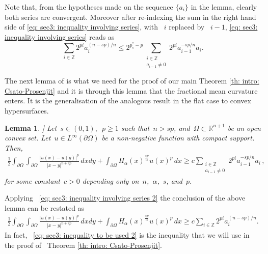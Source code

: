 \documentclass[reqno,12pt]{amsart}
\newcommand{\R}{\mathbb{R}}
\newcommand{\Z}{\mathbb{Z}}
\newcommand{\delomega}{\partial\Omega}
\numberwithin{equation}{section}
\theoremstyle{plain}
\newtheorem{lemma}[definition]{Lemma}
\theoremstyle{definition}
\renewcommand{\leq}{\leqslant}
\renewcommand{\ge}{\geqslant}
\begin{document}
Note that, from the hypotheses made on the sequence $\{a_{i}\}$ in the lemma, clearly both series are convergent. Moreover after re-indexing the sum in the 
right hand side of \eqref{eq: sec3: inequality involving series},
with ~$i$ replaced by ~$i-1$, \eqref{eq: sec3: inequality involving series} reads as 
\begin{equation}\label{eq: sec3: inequality involving series 2}
     \sum_{i\in \mathbb{Z}} 2^{pi} a_i^{(n-s p)/n} \leq 2^{p^{\ast}_s-p}\sum_{\substack {i\in\mathbb{Z} \\ a_{i-1}\neq 0}}2^{pi}a_{i-1}^{-s p/n}a_{i}.
\end{equation}


The next lemma of \cite{Cabre-Cozzi-Csato} is what we need for  the proof of our main  Theorem \ref{th: intro: Csato-Prosenjit} and it is through this lemma that the fractional mean curvature enters. It is the generalisation of the analogous result \cite[Lemma 6.3]{HitchhikersG} in the flat case to convex hypersurfaces.

\begin{lemma}\cite[Lemma 4.3]{Cabre-Cozzi-Csato}]
\label{Analogue Lemma 6.3 in HG} Let~$s\in (0,1),$~$p \ge 1$ such that~$n > s p$, and~$\Omega\subset\R^{n+1}$ be an open convex set. Let~${u}\in L^{\infty}({\delomega})$ be a non-negative function with compact support. 
Then, 
\begin{align*}
 \frac{1}{2}\int_{{\delomega}}\int_{{\delomega}}\frac{|{u}(x)-{u}(y)|^p}{|x-y|^{n+s p}}\, {dx}{dy}
 +\int_{{\delomega}} H_{\alpha}(x)^{\frac{s p}{\alpha}} {u}(x)^p \, {dx} \ge c \sum_{\substack{i\in\Z \\ a_{i-1}\neq 0}}2^{pi}a_{i-1}^{-s p/n}a_i \,,
\end{align*}
for some constant~$c>0$ depending only on~$n$,~$\alpha$,~$s$, and~$p$.
\end{lemma}
Applying ~\eqref{eq: sec3: inequality involving series 2} the conclusion of the above lemma can be restated as 
\begin{align}\label{eq: sec3: inequality to be used 2}
 \frac{1}{2}\int_{{\delomega}}\int_{{\delomega}}\frac{|{u}(x)-{u}(y)|^p}{|x-y|^{n+s p}}\, {dx}{dy}
 +\int_{{\delomega}} H_{\alpha}(x)^{\frac{s p}{\alpha}} {u}(x)^p \, {dx} \ge c \sum_{i\in\Z }2^{pi}a_{i}^{(n-sp)/n}.
\end{align}
In fact, ~\eqref{eq: sec3: inequality to be used 2}  is the inequality that we will use in the proof of ~Theorem \ref{th: intro: Csato-Prosenjit}. 
\end{document}
